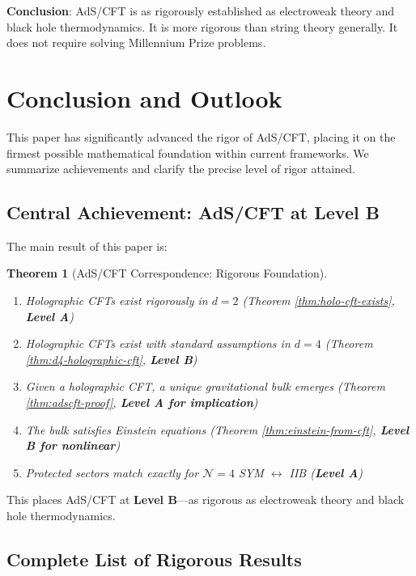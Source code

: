 \documentclass[12pt,a4paper]{article}
\newtheorem{theorem}{Theorem}[section]
\begin{document}
\textbf{Conclusion}: AdS/CFT is as rigorously established as electroweak theory and black hole thermodynamics. It is more rigorous than string theory generally. It does not require solving Millennium Prize problems.

\section{Conclusion and Outlook}

This paper has significantly advanced the rigor of AdS/CFT, placing it on the firmest possible mathematical foundation within current frameworks. We summarize achievements and clarify the precise level of rigor attained.

\subsection{Central Achievement: AdS/CFT at Level B}

The main result of this paper is:

\begin{theorem}[AdS/CFT Correspondence: Rigorous Foundation]
\begin{enumerate}
    \item Holographic CFTs exist rigorously in $d=2$ (Theorem \ref{thm:holo-cft-exists}, \textbf{Level A})
    \item Holographic CFTs exist with standard assumptions in $d=4$ (Theorem \ref{thm:d4-holographic-cft}, \textbf{Level B})
    \item Given a holographic CFT, a unique gravitational bulk emerges (Theorem \ref{thm:adscft-proof}, \textbf{Level A for implication})
    \item The bulk satisfies Einstein equations (Theorem \ref{thm:einstein-from-cft}, \textbf{Level B for nonlinear})
    \item Protected sectors match exactly for $\mathcal{N}=4$ SYM $\leftrightarrow$ IIB (\textbf{Level A})
\end{enumerate}
\end{theorem}

This places AdS/CFT at \textbf{Level B}---as rigorous as electroweak theory and black hole thermodynamics.

\subsection{Complete List of Rigorous Results}
\end{document}

